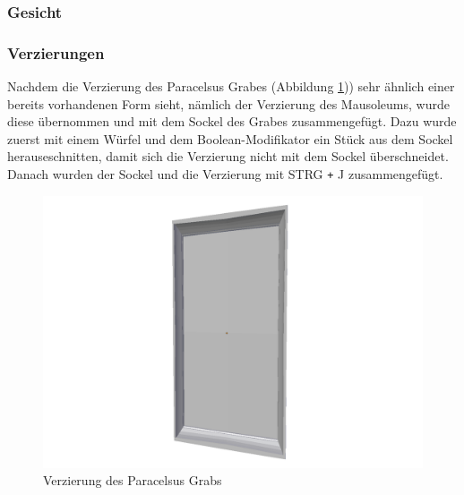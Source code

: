 \subsubsection{Gesicht}
\subsubsection{Verzierungen}
Nachdem die Verzierung des Paracelsus Grabes (Abbildung \ref{Paracelsus_Grab:image3})) sehr ähnlich einer bereits vorhandenen Form sieht, nämlich der Verzierung des Mausoleums, wurde diese übernommen und
mit dem Sockel des Grabes zusammengefügt. Dazu wurde zuerst mit einem Würfel und dem Boolean-Modifikator ein Stück aus dem Sockel herauseschnitten, damit
sich die Verzierung nicht mit dem Sockel überschneidet. Danach wurden der Sockel und die Verzierung mit STRG \verb-+- J zusammengefügt.
\begin{figure}[h]
    \centering
    \includegraphics[width=.8\textwidth]{images/Paracelsus-Grab_Verzierung.png}
    \caption{Verzierung des Paracelsus Grabs}
    \label{Paracelsus_Grab:image3}
\end{figure}


